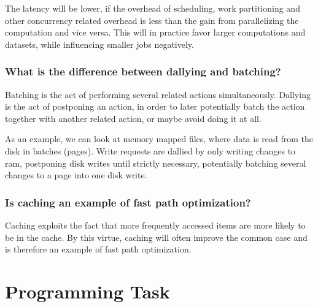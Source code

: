 \documentclass[11pt,a4paper]{article}
\begin{document}
The latency will be lower, if the overhead of scheduling, work partitioning and
other concurrency related overhead is less than the gain from parallelizing the
computation and vice versa. This will in practice favor larger computations and
datasets, while influencing smaller jobs negatively.

\subsubsection{What is the difference between dallying and batching?}

Batching is the act of performing several related actions simultaneously.
Dallying is the act of postponing an action, in order to later potentially batch
the action together with another related action, or maybe avoid doing it at all.

As an example, we can look at memory mapped files, where data is read from the
disk in batches (pages).
Write requests are dallied by only writing changes to ram, postponing disk
writes until strictly necessary, potentially batching several changes to a page
into one disk write.

\subsubsection{Is caching an example of fast path optimization?}

Caching exploits the fact that more frequently accessed items are more likely
to be in the cache. By this virtue, caching will often improve the common case
and is therefore an example of fast path optimization.

\section{Programming Task}
\end{document}
